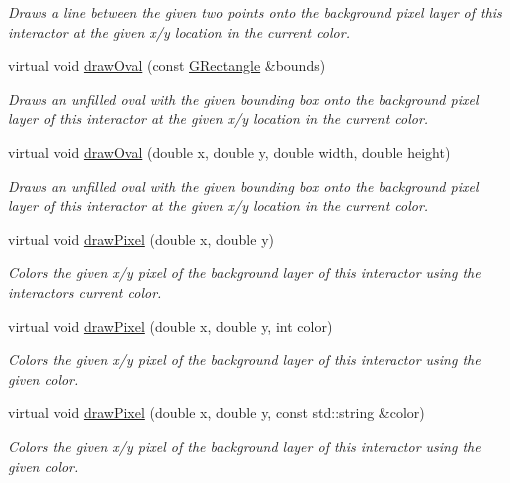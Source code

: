 \begin{DoxyCompactItemize}
\begin{DoxyCompactList}\small\item\em Draws a line between the given two points onto the background pixel layer of this interactor at the given x/y location in the current color. \end{DoxyCompactList}\item 
virtual void \mbox{\hyperlink{classsgl_1_1GDrawingSurface_a8adc13027efe311b4a6a715205b8bc46}{draw\+Oval}} (const \mbox{\hyperlink{structsgl_1_1GRectangle}{G\+Rectangle}} \&bounds)
\begin{DoxyCompactList}\small\item\em Draws an unfilled oval with the given bounding box onto the background pixel layer of this interactor at the given x/y location in the current color. \end{DoxyCompactList}\item 
virtual void \mbox{\hyperlink{classsgl_1_1GDrawingSurface_aa5b1cf902e578907da3c63060686354e}{draw\+Oval}} (double x, double y, double width, double height)
\begin{DoxyCompactList}\small\item\em Draws an unfilled oval with the given bounding box onto the background pixel layer of this interactor at the given x/y location in the current color. \end{DoxyCompactList}\item 
virtual void \mbox{\hyperlink{classsgl_1_1GDrawingSurface_a0c1e2923d8d163d62d0896d8c5cfa191}{draw\+Pixel}} (double x, double y)
\begin{DoxyCompactList}\small\item\em Colors the given x/y pixel of the background layer of this interactor using the interactor\textquotesingle{}s current color. \end{DoxyCompactList}\item 
virtual void \mbox{\hyperlink{classsgl_1_1GDrawingSurface_a3a64eb6383e601be8438e9c71643c432}{draw\+Pixel}} (double x, double y, int color)
\begin{DoxyCompactList}\small\item\em Colors the given x/y pixel of the background layer of this interactor using the given color. \end{DoxyCompactList}\item 
virtual void \mbox{\hyperlink{classsgl_1_1GDrawingSurface_a20abc26a94b7eb310e34abf668e0f5f4}{draw\+Pixel}} (double x, double y, const std\+::string \&color)
\begin{DoxyCompactList}\small\item\em Colors the given x/y pixel of the background layer of this interactor using the given color. \end{DoxyCompactList}\item 

\end{DoxyCompactItemize}
